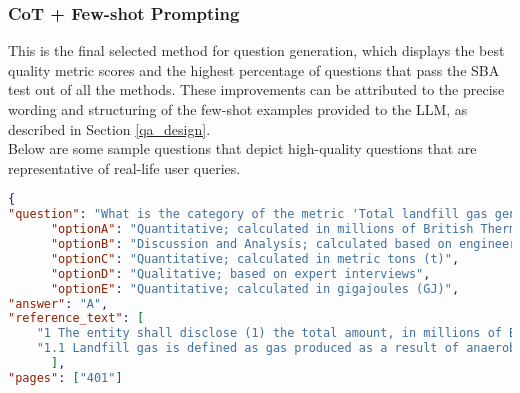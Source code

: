 \subsubsection{CoT + Few-shot Prompting}

This is the final selected method for question generation, which displays the best quality metric scores and the highest percentage of questions that pass the SBA test out of all the methods. These improvements can be attributed to the precise wording and structuring of the few-shot examples provided to the LLM, as described in Section \ref{qa_design}. \\

Below are some sample questions that depict high-quality questions that are representative of real-life user queries.

\begin{lstlisting}[language=JSON,firstnumber=1,label={lst:few_example2},caption={Question Example 1: Local multi-hop MCQ}]
{
"question": "What is the category of the metric 'Total landfill gas generated' in the Waste Management industry and how should this metric be calculated?",
      "optionA": "Quantitative; calculated in millions of British Thermal Units (MMBtu)",
      "optionB": "Discussion and Analysis; calculated based on engineering estimates",
      "optionC": "Quantitative; calculated in metric tons (t)",
      "optionD": "Qualitative; based on expert interviews",
      "optionE": "Quantitative; calculated in gigajoules (GJ)",
"answer": "A",
"reference_text": [
    "1 The entity shall disclose (1) the total amount, in millions of British Thermal Units (MMBtu), of landfill gas generated from its owned or operated facilities.",
    "1.1 Landfill gas is defined as gas produced as a result of anaerobic decomposition of waste materials in the landfill."
      ],
"pages": ["401"]
\end{lstlisting}

